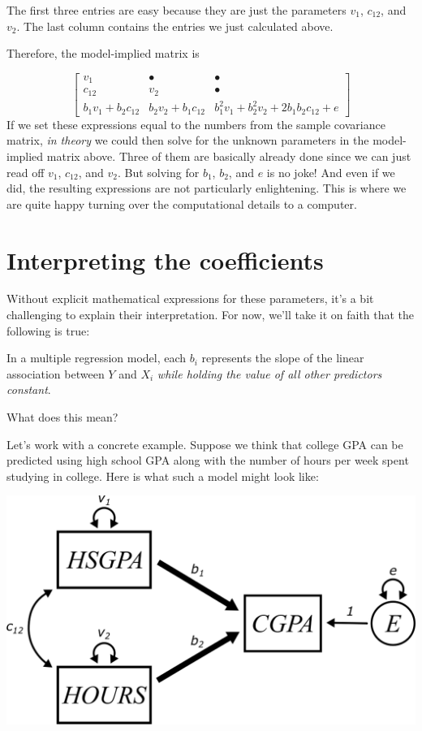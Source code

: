 \documentclass[
]{book}
\begin{document}
The first three entries are easy because they are just the parameters \(v_{1}\), \(c_{12}\), and \(v_{2}\). The last column contains the entries we just calculated above.

Therefore, the model-implied matrix is

\[
\begin{bmatrix}
v_{1}   &   \bullet &  \bullet  \\
c_{12}  &   v_{2}   &  \bullet \\
b_{1} v_{1} + b_{2} c_{12}  &  b_{2} v_{2} + b_{1} c_{12}  &   b_{1}^{2} v_{1} + b_{2}^{2} v_{2} + 2b_{1}b_{2} c_{12} + e
\end{bmatrix}
\]
If we set these expressions equal to the numbers from the sample covariance matrix, \emph{in theory} we could then solve for the unknown parameters in the model-implied matrix above. Three of them are basically already done since we can just read off \(v_{1}\), \(c_{12}\), and \(v_{2}\). But solving for \(b_{1}\), \(b_{2}\), and \(e\) is no joke! And even if we did, the resulting expressions are not particularly enlightening. This is where we are quite happy turning over the computational details to a computer.

\hypertarget{multiple-interpreting}{%
\section{Interpreting the coefficients}\label{multiple-interpreting}}

Without explicit mathematical expressions for these parameters, it's a bit challenging to explain their interpretation. For now, we'll take it on faith that the following is true:

In a multiple regression model, each \(b_{i}\) represents the slope of the linear association between \(Y\) and \(X_{i}\) \emph{while holding the value of all other predictors constant}.

What does this mean?

Let's work with a concrete example. Suppose we think that college GPA can be predicted using high school GPA along with the number of hours per week spent studying in college. Here is what such a model might look like:

\begin{center}\includegraphics{graphics/multiple_regression_example} \end{center}
\end{document}
